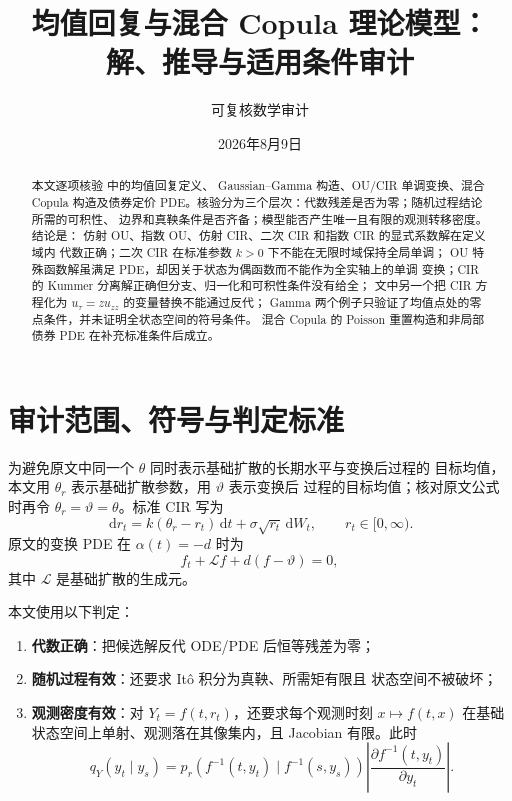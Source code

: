 \documentclass[UTF8,11pt]{ctexart}
\title{均值回复与混合 Copula 理论模型：解、推导与适用条件审计}
\author{可复核数学审计}
\date{2026年8月9日}
\newcommand{\dd}{\,\mathrm d}
\begin{document}
\maketitle

\begin{abstract}
本文逐项核验  中的均值回复定义、
Gaussian--Gamma 构造、OU/CIR 单调变换、混合 Copula 构造及债券定价
PDE。核验分为三个层次：代数残差是否为零；随机过程结论所需的可积性、
边界和真鞅条件是否齐备；模型能否产生唯一且有限的观测转移密度。结论是：
仿射 OU、指数 OU、仿射 CIR、二次 CIR 和指数 CIR 的显式系数解在定义域内
代数正确；二次 CIR 在标准参数 $k>0$ 下不能在无限时域保持全局单调；
OU 特殊函数解虽满足 PDE，却因关于状态为偶函数而不能作为全实轴上的单调
变换；CIR 的 Kummer 分离解正确但分支、归一化和可积性条件没有给全；
文中另一个把 CIR 方程化为 $u_\tau=zu_{zz}$ 的变量替换不能通过反代；
Gamma 两个例子只验证了均值点处的零点条件，并未证明全状态空间的符号条件。
混合 Copula 的 Poisson 重置构造和非局部债券 PDE 在补充标准条件后成立。
\end{abstract}

\section{审计范围、符号与判定标准}

为避免原文中同一个 $\theta$ 同时表示基础扩散的长期水平与变换后过程的
目标均值，本文用 $\theta_r$ 表示基础扩散参数，用 $\vartheta$ 表示变换后
过程的目标均值；核对原文公式时再令 $\theta_r=\vartheta=\theta$。标准 CIR
写为
\begin{equation}
 \dd r_t=k(\theta_r-r_t)\dd t+\sigma\sqrt{r_t}\dd W_t,
 \qquad r_t\in[0,\infty).
 \label{eq:cir}
\end{equation}
原文的变换 PDE 在 $\alpha(t)=-d$ 时为
\begin{equation}
 f_t+\mathcal L f+d(f-\vartheta)=0,
 \label{eq:master-pde}
\end{equation}
其中 $\mathcal L$ 是基础扩散的生成元。

本文使用以下判定：
\begin{enumerate}[label=(\roman*)]
 \item \textbf{代数正确}：把候选解反代 ODE/PDE 后恒等残差为零；
 \item \textbf{随机过程有效}：还要求 It\^o 积分为真鞅、所需矩有限且
       状态空间不被破坏；
 \item \textbf{观测密度有效}：对 $Y_t=f(t,r_t)$，还要求每个观测时刻
       $x\mapsto f(t,x)$ 在基础状态空间上单射、观测落在其像集内，且
       Jacobian 有限。此时
 \begin{equation}
 q_Y(y_t\mid y_s)=p_r\!\left(f^{-1}(t,y_t)\mid f^{-1}(s,y_s)\right)
 \left|\frac{\partial f^{-1}(t,y_t)}{\partial y_t}\right|.
 \label{eq:change-density}
 \end{equation}
\end{enumerate}
\end{document}
